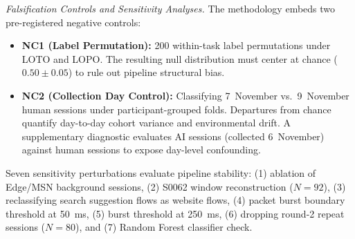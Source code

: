 \textit{Falsification Controls and Sensitivity Analyses.}
The methodology embeds two pre-registered negative controls:
\begin{itemize}
    \item \textbf{NC1 (Label Permutation):} 200 within-task label permutations under LOTO and LOPO. The resulting null distribution must center at chance ($0.50 \pm 0.05$) to rule out pipeline structural bias.
    \item \textbf{NC2 (Collection Day Control):} Classifying 7~November vs.\ 9~November human sessions under participant-grouped folds. Departures from chance quantify day-to-day cohort variance and environmental drift. A supplementary diagnostic evaluates AI sessions (collected 6~November) against human sessions to expose day-level confounding.
\end{itemize}
Seven sensitivity perturbations evaluate pipeline stability: (1) ablation of Edge/MSN background sessions, (2) S0062 window reconstruction ($N=92$), (3) reclassifying search suggestion flows as website flows, (4) packet burst boundary threshold at 50~ms, (5) burst threshold at 250~ms, (6) dropping round-2 repeat sessions ($N=80$), and (7) Random Forest classifier check.

